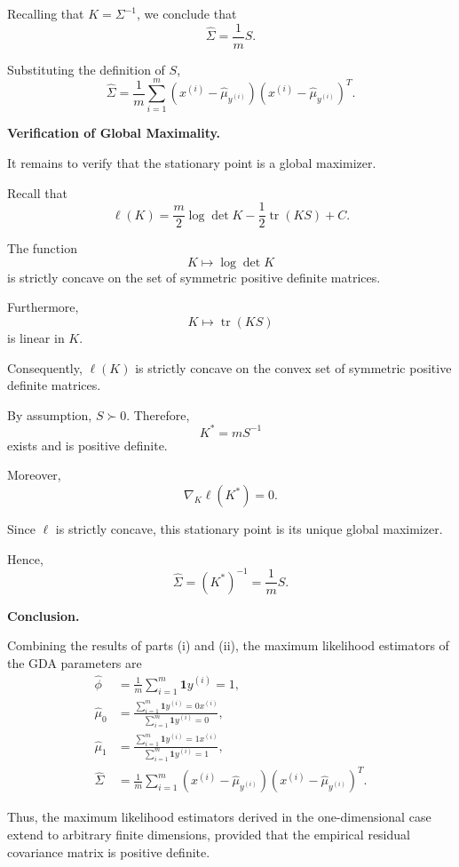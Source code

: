 \documentclass[10pt]{article}
\newcommand{\ind}{\mathbf{1}}
\begin{document}
\begin{enumerate}
\begin{enumerate}[label=(\alph*)]
Recalling that $K=\Sigma^{-1}$,
we conclude that
\[
\boxed{
\hat{\Sigma}
=
\frac{1}{m}S.
}
\]

Substituting the definition of $S$,
\[
\boxed{
\hat{\Sigma}
=
\frac{1}{m}
\sum_{i=1}^{m}
\left(
x^{(i)}-\hat{\mu}_{y^{(i)}}
\right)
\left(
x^{(i)}-\hat{\mu}_{y^{(i)}}
\right)^T.
}
\]

\medskip
\noindent\textbf{Verification of Global Maximality.}

It remains to verify that the stationary point
is a global maximizer.

Recall that
\[
\ell(K)
=
\frac{m}{2}\log\det K
-
\frac{1}{2}\operatorname{tr}(KS)
+C.
\]

The function
\[
K\longmapsto\log\det K
\]
is strictly concave on the set of symmetric
positive definite matrices.

Furthermore,
\[
K\longmapsto\operatorname{tr}(KS)
\]
is linear in $K$.

Consequently, $\ell(K)$ is strictly concave
on the convex set of symmetric positive
definite matrices.

By assumption, $S\succ0$. Therefore,
\[
K^*
=
mS^{-1}
\]
exists and is positive definite.

Moreover,
\[
\nabla_K\ell(K^*)=0.
\]

Since $\ell$ is strictly concave,
this stationary point is its unique
global maximizer.

Hence,
\[
\boxed{
\hat{\Sigma}
=
(K^*)^{-1}
=
\frac{1}{m}S.
}
\]

\medskip
\noindent\textbf{Conclusion.}

Combining the results of parts (i) and (ii),
the maximum likelihood estimators of the
GDA parameters are
\[
\boxed{
\begin{aligned}
\hat{\phi}
&=
\frac{1}{m}
\sum_{i=1}^{m}
\ind{y^{(i)}=1},
\\[10pt]
\hat{\mu}_0
&=
\frac{
\sum_{i=1}^{m}
\ind{y^{(i)}=0}x^{(i)}
}{
\sum_{i=1}^{m}
\ind{y^{(i)}=0}
},
\\[10pt]
\hat{\mu}_1
&=
\frac{
\sum_{i=1}^{m}
\ind{y^{(i)}=1}x^{(i)}
}{
\sum_{i=1}^{m}
\ind{y^{(i)}=1}
},
\\[10pt]
\hat{\Sigma}
&=
\frac{1}{m}
\sum_{i=1}^{m}
(x^{(i)}-\hat{\mu}_{y^{(i)}})
(x^{(i)}-\hat{\mu}_{y^{(i)}})^T.
\end{aligned}
}
\]

Thus, the maximum likelihood estimators derived
in the one-dimensional case extend to arbitrary
finite dimensions, provided that the empirical
residual covariance matrix is positive definite.


\end{enumerate}
\end{enumerate}
\end{document}
